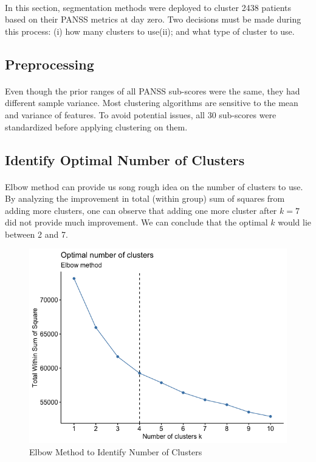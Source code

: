 \documentclass[11pt]{article}
\begin{document}
	\paragraph{} In this section, segmentation methods were deployed to cluster 2438 patients based on their PANSS metrics at day zero. Two decisions must be made during this process: (i) how many clusters to use(ii); and what type of cluster to use.
	\subsection{Preprocessing}
	\paragraph{} Even though the prior ranges of all PANSS sub-scores were the same, they had different sample variance. Most clustering algorithms are sensitive to the mean and variance of features. To avoid potential issues, all 30 sub-scores were standardized before applying clustering on them.

	\subsection{Identify Optimal Number of Clusters}
	\paragraph{} Elbow method can provide us song rough idea on the number of clusters to use. By analyzing the improvement in total (within group) sum of squares from adding more clusters, one can observe that adding one more cluster after $k=7$ did not provide much improvement. We can conclude that the optimal $k$ would lie between 2 and 7.
	
	\begin{figure}[H]
		\centering
		\includegraphics[width=0.7\linewidth]{figures/Elbow_method.png}
		\caption{Elbow Method to Identify Number of Clusters}
	\end{figure}
	
\end{document}
